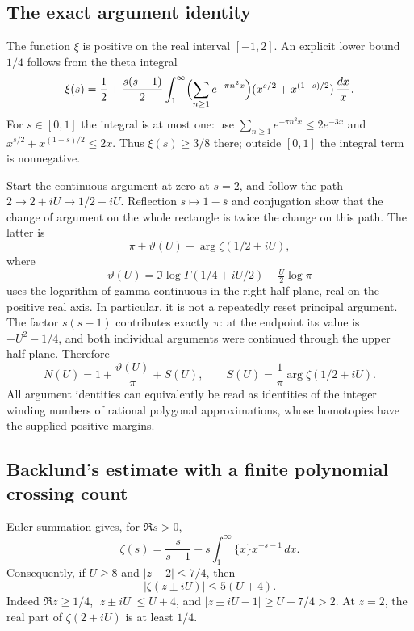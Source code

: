 \subsection{The exact argument identity}

The function $\xi$ is positive on the real interval $[-1,2]$.
An explicit lower bound $1/4$ follows from the theta integral
\[
 \xi(s)=\frac12+\frac{s(s-1)}2
 \int_1^\infty \Bigl(\sum_{n\ge1}e^{-\pi n^2x}\Bigr)
       (x^{s/2}+x^{(1-s)/2})\,\frac{dx}{x}.
\]
For $s\in[0,1]$ the integral is at most one: use
$\sum_{n\ge1}e^{-\pi n^2x}\le2e^{-3x}$ and
$x^{s/2}+x^{(1-s)/2}\le2x$.
Thus $\xi(s)\ge3/8$ there; outside $[0,1]$ the integral term is
nonnegative.

Start the continuous argument at zero at $s=2$, and follow the path
$2\to2+iU\to1/2+iU$.  Reflection
$s\mapsto1-\overline s$ and conjugation show that the change of argument
on the whole rectangle is twice the change on this path.  The latter is
\[
 \pi+\vartheta(U)+\arg\zeta(1/2+iU),
\]
where
\[
 \vartheta(U)=\Im\log\Gamma(1/4+iU/2)-\tfrac U2\log\pi
\]
uses the logarithm of gamma continuous in the right half-plane, real on the
positive real axis.  In particular, it is not a repeatedly reset principal
argument.  The factor $s(s-1)$ contributes exactly $\pi$: at the endpoint
its value is $-U^2-1/4$, and both individual arguments were continued through
the upper half-plane.  Therefore
\[
 N(U)=1+\frac{\vartheta(U)}\pi+S(U),\qquad
 S(U)=\frac1\pi\arg\zeta(1/2+iU).                       \tag{C1}
\]
All argument identities can equivalently be read as identities of the
integer winding numbers of rational polygonal approximations, whose
homotopies have the supplied positive margins.

\subsection{Backlund's estimate with a finite polynomial crossing count}

Euler summation gives, for $\Re s>0$,
\[
 \zeta(s)=\frac{s}{s-1}-s\int_1^\infty\{x\}x^{-s-1}\,dx.
\]
Consequently, if $U\ge8$ and $|z-2|\le7/4$, then
\[
 |\zeta(z\pm iU)|\le5(U+4).
\]
Indeed $\Re z\ge1/4$, $|z\pm iU|\le U+4$, and
$|z\pm iU-1|\ge U-7/4>2$.
At $z=2$, the real part of $\zeta(2+iU)$ is at least $1/4$.

